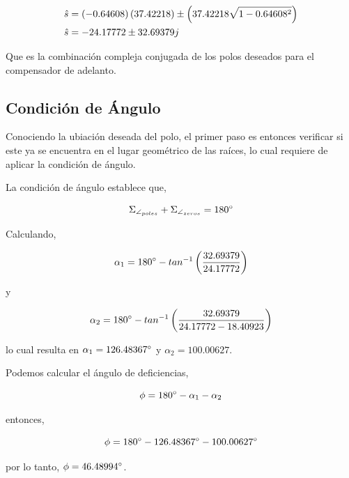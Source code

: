 \documentclass[12pt,a4paper]{article}
\begin{document}
        \begin{equation}
          \centering
          \begin{aligned}
            \hat{s} &= \left(-0.64608\right) \left(37.42218\right) \pm \left(37.42218\sqrt{1-0.64608^{2}}\right) \\
            \hat{s} &= -24.17772 \pm 32.69379j
          \end{aligned}
        \end{equation}

        Que es la combinación compleja conjugada de los polos deseados para el compensador de adelanto. 

      \subsection{Condición de Ángulo}

        Conociendo la ubiación deseada del polo, el primer paso es entonces verificar si este ya se encuentra en 
        el lugar geométrico de las raíces, lo cual requiere de aplicar la condición de ángulo. 

        La condición de ángulo establece que, 

        \begin{equation}
          \Sigma_{\angle_{poles}} + \Sigma_{\angle_{zeros}} = 180\degree
          \label{eq:design:angle_condition} 
        \end{equation}

        Calculando,
        
        \[ \alpha_{1} = 180\degree - tan^{-1}\left(\dfrac{32.69379}{24.17772}\right) \]

        y 

        \[ \alpha_{2} = 180\degree - tan^{-1}\left(\dfrac{32.69379}{24.17772 - 18.40923}\right) \]

        lo cual resulta en \( \alpha_{1} = 126.48367\degree \) y \( \alpha_{2} = 100.00627 \).

        Podemos calcular el ángulo de deficiencias, 

        \begin{equation}
          \phi = 180\degree - \alpha_{1} - \alpha_{2} 
        \end{equation}

        entonces, 

        \[ \phi =  180\degree - 126.48367\degree - 100.00627\degree \]

        por lo tanto, \( \phi = 46.48994\degree \).
\end{document}
